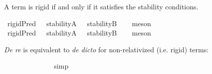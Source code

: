 \begin{isabellebody}
\begin{isamarkuptext}
A term is rigid if and only if it satisfies the stability conditions.%
\end{isamarkuptext}\isamarkuptrue%
\isamarkupfalse%
\ {\isachardoublequoteopen}{\isasymlfloor}rigidPred\ {\isacharparenleft}{\isasymtau}{\isacharcolon}{\isacharcolon}{\isasymup}{\isasymlangle}{\isasymzero}{\isasymrangle}{\isacharparenright}{\isasymrfloor}\ {\isasymlongleftrightarrow}\ {\isasymlfloor}{\isacharparenleft}stabilityA\ {\isasymtau}\ \isactrlbold {\isasymand}\ stabilityB\ {\isasymtau}{\isacharparenright}{\isasymrfloor}{\isachardoublequoteclose}%
\ %
%
\isamarkupfalse%
\ meson%
%
%
\ \ \ \isanewline
{}\isamarkupfalse%
\ {\isachardoublequoteopen}{\isasymlfloor}rigidPred\ {\isacharparenleft}{\isasymtau}{\isacharcolon}{\isacharcolon}{\isasymup}{\isasymlangle}{\isasymup}{\isasymzero}{\isasymrangle}{\isacharparenright}{\isasymrfloor}\ {\isasymlongleftrightarrow}\ {\isasymlfloor}{\isacharparenleft}stabilityA\ {\isasymtau}\ \isactrlbold {\isasymand}\ stabilityB\ {\isasymtau}{\isacharparenright}{\isasymrfloor}{\isachardoublequoteclose}%
\ %
%
\isamarkupfalse%
\ meson%
%
%
%
\isamarkuptrue%
%
\begin{isamarkuptext}%
\emph{De re} is equivalent to \emph{de dicto} for non-relativized (i.e. rigid) terms:%
\end{isamarkuptext}\isamarkuptrue%
\isamarkupfalse%
\ {\isachardoublequoteopen}{\isasymlfloor}\isactrlbold {\isasymforall}{\isasymalpha}{\isachardot}\ {\isacharparenleft}{\isacharparenleft}{\isasymlambda}{\isasymbeta}{\isachardot}\ \isactrlbold {\isasymbox}{\isacharparenleft}{\isasymalpha}\ {\isasymbeta}{\isacharparenright}{\isacharparenright}\ {\isacharparenleft}{\isasymtau}{\isacharcolon}{\isacharcolon}{\isasymlangle}{\isasymzero}{\isasymrangle}{\isacharparenright}{\isacharparenright}\ \ \isactrlbold {\isasymleftrightarrow}\ \isactrlbold {\isasymbox}{\isacharparenleft}{\isacharparenleft}{\isasymlambda}{\isasymbeta}{\isachardot}\ {\isacharparenleft}{\isasymalpha}\ {\isasymbeta}{\isacharparenright}{\isacharparenright}\ {\isasymtau}{\isacharparenright}{\isasymrfloor}{\isachardoublequoteclose}%
\ %
%
\isamarkupfalse%
\ simp%
%
%
\isanewline
{}\isamarkupfalse%
\ {\isachardoublequoteopen}{\isasymlfloor}\isactrlbold {\isasymforall}{\isasymalpha}{\isachardot}\ {\isacharparenleft}{\isacharparenleft}{\isasymlambda}{\isasymbeta}{\isachardot}\ \isactrlbold {\isasymbox}{\isacharparenleft}{\isasymalpha}\ {\isasymbeta}{\isacharparenright}{\isacharparenright}\ {\isacharparenleft}{\isasymtau}{\isacharcolon}{\isacharcolon}{\isasymup}{\isasymlangle}{\isasymzero}{\isasymrangle}{\isacharparenright}{\isacharparenright}\ \isactrlbold {\isasymleftrightarrow}\ \isactrlbold {\isasymbox}{\isacharparenleft}{\isacharparenleft}{\isasymlambda}{\isasymbeta}{\isachardot}\ {\isacharparenleft}{\isasymalpha}\ {\isasymbeta}{\isacharparenright}{\isacharparenright}\ {\isasymtau}{\isacharparenright}{\isasymrfloor}{\isachardoublequoteclose}%

\end{isabellebody}
